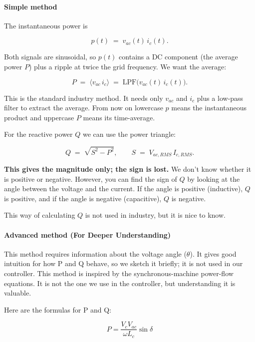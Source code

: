 \documentclass[11pt]{article}
\begin{document}
    \hypertarget{simple-method}{%
\paragraph{Simple method}\label{simple-method}}

    The instantaneous power is

\[
p(t) \;=\; v_{ac}(t)\, i_c(t).
\]

Both signals are sinusoidal, so \(p(t)\) contains a DC component (the
average power \(P\)) plus a ripple at twice the grid frequency. We want
the average:

\[
P \;=\; \langle v_{ac}\, i_c \rangle \;=\; \text{LPF}\big(v_{ac}(t)\, i_c(t)\big).
\]

This is the standard industry method. It needs only \(v_{ac}\) and
\(i_c\) plus a low-pass filter to extract the average. From now on
lowercase \(p\) means the instantaneous product and uppercase \(P\)
means its time-average.

For the reactive power \(Q\) we can use the power triangle:

\[
Q \;=\; \sqrt{S^2 - P^2}, \qquad S \;=\; V_{ac, RMS}\, I_{c, RMS}.
\]

\textbf{This gives the magnitude only; the sign is lost.} We don't know
whether it is positive or negative. However, you can find the sign of
\(Q\) by looking at the angle between the voltage and the current. If
the angle is positive (inductive), \(Q\) is positive, and if the angle
is negative (capacitive), \(Q\) is negative.

This way of calculating \(Q\) is not used in industry, but it is nice
to know.

    \hypertarget{advanced-method-for-deeper-understanding}{%
\paragraph{Advanced method (For Deeper
Understanding)}\label{advanced-method-for-deeper-understanding}}

    This method requires information about the voltage angle (\(\theta\)).
It gives good intuition for how P and Q behave, so we sketch it briefly;
it is not used in our controller. This method is inspired by the
synchronous-machine power-flow equations. It is not the one we use in
the controller, but understanding it is valuable.

Here are the formulas for P and Q:

\[
    P = \frac{V_c V_{ac}}{\omega L_c} \sin \delta
\]
\end{document}
